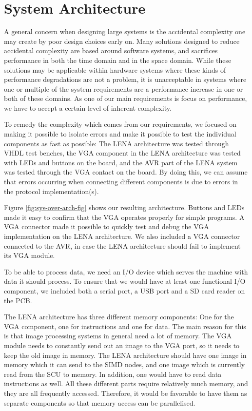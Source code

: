 \section{System Architecture}

A general concern when designing large systems is the accidental
complexity\cite[p.~8-9]{holt2004uml} one may create by poor design choices early
on. Many solutions designed to reduce accidental complexity are based around
software systems, and sacrifices performance in both the time domain and in the
space domain\cite{moseley2006out}. While these solutions may be applicable
within hardware systems where these kinds of performance degradations are not a
problem, it is unacceptable in systems where one or multiple of the system
requirements are a performance increase in one or both of these domains. As one
of our main requirements is focus on performance, we have to accept a certain
level of inherent complexity.


To remedy the complexity which comes from our requirements, we focused on making
it possible to isolate errors and make it possible to test the individual
components as fast as possible: The \ac{LENA} architecture was tested through
\ac{VHDL} test benches, the \ac{VGA} component in the \ac{LENA} architecture was
tested with \acp{LED} and buttons on the board, and the AVR part of the
\ac{LENA} system was tested through the \ac{VGA} contact on the board. By doing
this, we can assume that errors occurring when connecting different components is
due to errors in the protocol implementation(s).

Figure \ref{fig:sys-over-arch-fig} shows our resulting architecture. Buttons and
\acp{LED} made it easy to confirm that the \ac{VGA} operates properly for simple
programs. A \ac{VGA} connector made it possible to quickly test and debug the
\ac{VGA} implementation on the \ac{LENA} architecture. We also included a
\ac{VGA} connector connected to the AVR, in case the \ac{LENA} architecture
should fail to implement its \ac{VGA} module.

To be able to process data, we need an \ac{I/O} device which serves the machine
with data it should process. To ensure that we would have at least one
functional \ac{I/O} component, we included both a serial
port, a \ac{USB} port and a \ac{SD} card reader on the \ac{PCB}.

The \ac{LENA} architecture has three different memory components: One for the
\ac{VGA} component, one for instructions and one for data. The main reason for
this is that image processing systems in general need a lot of memory. The
\ac{VGA} module needs to constantly send out an image to the \ac{VGA} port, so
it needs to keep the old image in memory. The \ac{LENA} architecture should have
one image in memory which it can send to the \ac{SIMD} nodes, and one image
which is currently read from the \ac{SCU} to memory. In addition, one would have
to read data instructions as well. All these different parts require relatively
much memory, and they are all frequently accessed. Therefore, it would be
favorable to have them as separate components so that memory access can be
parallelised.
